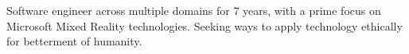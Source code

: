 \documentclass[11pt, a4paper]{awesome-cv}
\begin{document}
\makecvheader[C]


\begin{cvparagraph}

	Software engineer across multiple domains for 7 years, with a prime focus on Microsoft Mixed Reality technologies. Seeking ways to apply technology ethically for betterment of humanity.
\end{cvparagraph}


\end{document}
